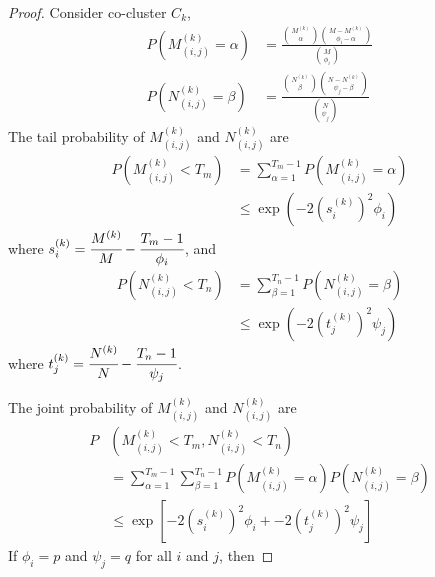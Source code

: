 \begin{proof}
    Consider co-cluster $C_k$,
    \begin{equation}
        \begin{split}
            P(M_{(i,j)}^{(k)} = \alpha) & = \frac{\binom{M^{(k)}}{\alpha} \binom{M-M^{(k)}}{\phi_i-\alpha}}{\binom{M}{\phi_i}} \\
            P(N_{(i,j)}^{(k)} = \beta)  & = \frac{\binom{N^{(k)}}{\beta} \binom{N-N^{(k)}}{\psi_j-\beta}}{\binom{N}{\psi_j}}
        \end{split}
    \end{equation}
    The tail probability of $M_{(i,j)}^{(k)}$ and $N_{(i,j)}^{(k)}$ are
    \begin{equation}
        \begin{split}
            P(M_{(i,j)}^{(k)} < T_m) & = \sum_{\alpha=1}^{T_m-1} P(M_{(i,j)}^{(k)} = \alpha) \\
                                     & \le \exp(-2 (s_i^{(k)})^2 \phi_i)
        \end{split}
    \end{equation}
    where $s_i^{(k)} = \cfrac{M^{(k)}}{M}-\cfrac{T_m-1}{\phi_i}$, and
    \begin{equation}
        \begin{split}
            P(N_{(i,j)}^{(k)} < T_n) & = \sum_{\beta=1}^{T_n-1} P(N_{(i,j)}^{(k)} = \beta) \\
                                     & \le \exp (-2 (t_j^{(k)})^2 \psi_j)
        \end{split}
    \end{equation}
    where $t_j^{(k)} = \cfrac{N^{(k)}}{N}-\cfrac{T_n-1}{\psi_j}$.

    The joint probability of $M_{(i,j)}^{(k)}$ and $N_{(i,j)}^{(k)}$ are
    \begin{equation}
        \begin{split}
            P & (M_{(i,j)}^{(k)} < T_m, N_{(i,j)}^{(k)} < T_n)              \\ & = \sum_{\alpha=1}^{T_m-1} \sum_{\beta=1}^{T_n-1} P(M_{(i,j)}^{(k)} = \alpha) P(N_{(i,j)}^{(k)} = \beta) \\
              & \le \exp[-2 (s_i^{(k)})^2 \phi_i + -2 (t_j^{(k)})^2 \psi_j]
        \end{split}
    \end{equation}
    If $\phi_i = p$ and $\psi_j = q$ for all $i$ and $j$, then


\end{proof}
